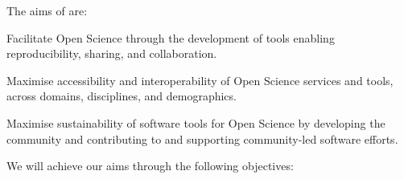 
\noindent The aims of \TheProject are:

\begin{compactenum}

\item \label{aim:facilitation}
  Facilitate Open Science through the development
  of tools enabling reproducibility, sharing, and collaboration.

\item \label{aim:accessibility}
  Maximise accessibility and interoperability of Open Science services and tools,
  across domains, disciplines, and demographics.

\item \label{aim:sustainability}
  Maximise sustainability of software tools for Open Science
  by developing the community and contributing
  to and supporting community-led software efforts.

\end{compactenum}

\noindent We will achieve our aims through the following objectives:

